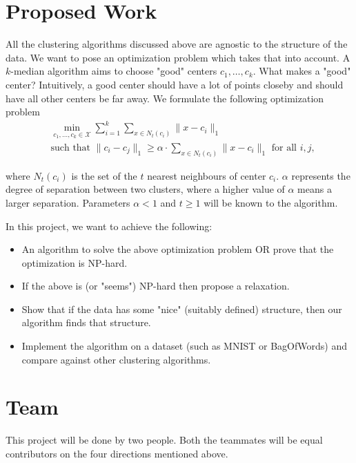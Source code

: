 \documentclass{article}
\newcommand{\mc}{\mathcal}
\begin{document}
\section{Proposed Work}
All the clustering algorithms discussed above are agnostic to the structure of the data. We want to pose an optimization problem which takes that into account. A $k$-median algorithm aims to choose "good" centers $c_1, \ldots, c_k$. What makes a "good" center? Intuitively, a good center should have a lot of points closeby and should have all other centers be far away. We formulate the following optimization problem
\begin{align*}
	&\min_{c_1, \ldots, c_k \in \mc X} \sum_{i=1}^k \sum_{x \in N_t(c_i)} \|x-c_i\|_1 \\
	& \text{such that } \|c_i - c_j\|_1 \ge \alpha\cdot\sum_{x \in N_t(c_i)} \|x-c_i\|_1 \text{ for all }i, j,
\end{align*}

where $N_t(c_i)$ is the set of the $t$ nearest neighbours of center $c_i$. $\alpha$ represents the degree of separation between two clusters, where a higher value of $\alpha$ means a larger separation. Parameters $\alpha < 1$ and $t \geq 1$ will be known to the algorithm.

In this project, we want to achieve the following:
\begin{itemize}
\item An algorithm to solve the above optimization problem OR prove that the optimization is NP-hard. 
\item If the above is (or "seems") NP-hard then propose a relaxation.
\item Show that if the data has some "nice" (suitably defined) structure, then our algorithm finds that structure.
\item Implement the algorithm on a dataset (such as MNIST or BagOfWords) and compare against other clustering algorithms.
\end{itemize}

\section{Team}
This project will be done by two people. Both the teammates will be equal contributors on the four directions mentioned above.



\end{document}
